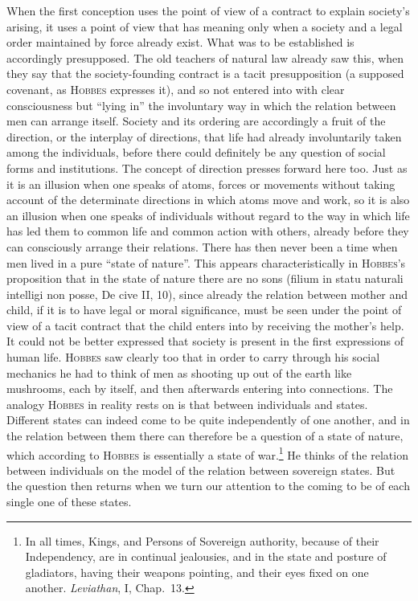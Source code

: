 \documentclass[12pt]{book}
\begin{document}
When the first conception uses the point of view of a contract to explain society's
arising, it uses a point of view that has meaning only when a society and a legal order
maintained by force already exist. What was to be established is accordingly
presupposed. The old teachers of natural law already saw this, when they say that the
society-founding contract is a tacit presupposition (a supposed covenant, as
\textsc{Hobbes} expresses it), and so not entered into with clear consciousness but
``lying in'' the involuntary way in which the relation between men can arrange itself.
Society and its ordering are accordingly a fruit of the direction, or the interplay of
directions, that life had already involuntarily taken among the individuals, before
there could definitely be any question of social forms and institutions. The concept of
direction presses forward here too. Just as it is an illusion when one speaks of atoms,
forces or movements without taking account of the determinate directions in which atoms
move and work, so it is also an illusion when one speaks of individuals without regard
to the way in which life has led them to common life and common action with others,
already before they can consciously arrange their relations. There has then never been
a time when men lived in a pure ``state of nature''. This appears characteristically in
\textsc{Hobbes}'s proposition that in the state of nature there are no sons (filium in
statu naturali intelligi non posse, De cive II, 10), since already the relation between
mother and child, if it is to have legal or moral significance, must be seen under the
point of view of a tacit contract that the child enters into by receiving the mother's
help. It could not be better expressed that society is present in the first expressions
of human life. \textsc{Hobbes} saw clearly too that in order to carry through his social
mechanics he had to think of men as shooting up out of the earth like mushrooms, each by
itself, and then afterwards entering into connections. The analogy \textsc{Hobbes} in
reality rests on is that between individuals and states. Different states can indeed come
to be quite independently of one another, and in the relation between them there can
therefore be a question of a state of nature, which according to \textsc{Hobbes} is
essentially a state of war.\footnote{In all times, Kings, and Persons of Sovereign
authority, because of their Independency, are in continual jealousies, and in the state
and posture of gladiators, having their weapons pointing, and their eyes fixed on one
another. \textit{Leviathan}, I, Chap.\ 13.} He thinks of the relation between individuals
on the model of the relation between sovereign states. But the question then returns when
we turn our attention to the coming to be of each single one of these states.
\end{document}
